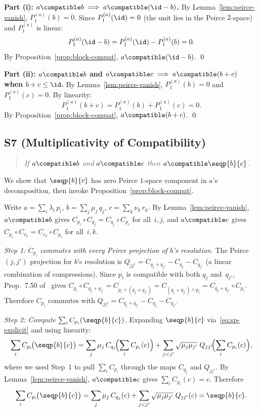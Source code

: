 \noindent\textbf{Part (i): $a \compatible b \implies a \compatible
(\id - b)$.}
By Lemma~\ref{lem:peirce-vanish}, $P_1^{(a)}(b) = 0$.  Since
$P_1^{(a)}(\id) = 0$ (the unit lies in the Peirce $2$-space) and
$P_1^{(a)}$ is linear:
\[
  P_1^{(a)}(\id - b) = P_1^{(a)}(\id) - P_1^{(a)}(b) = 0.
\]
By Proposition~\ref{prop:block-compat}, $a \compatible (\id - b)$.
\qed

\medskip
\noindent\textbf{Part (ii): $a \compatible b$ and $a \compatible c
\implies a \compatible (b+c)$ when $b + c \le \id$.}
By Lemma~\ref{lem:peirce-vanish}, $P_1^{(a)}(b) = 0$ and
$P_1^{(a)}(c) = 0$.  By linearity:
\[
  P_1^{(a)}(b + c) = P_1^{(a)}(b) + P_1^{(a)}(c) = 0.
\]
By Proposition~\ref{prop:block-compat}, $a \compatible (b+c)$. \qed

\subsection*{S7 (Multiplicativity of Compatibility)}

\begin{quote}
\emph{If $a \compatible b$ and $a \compatible c$ then
$a \compatible \seqp{b}{c}$.}
\end{quote}

We show that $\seqp{b}{c}$ has zero Peirce $1$-space component in $a$'s
decomposition, then invoke
Proposition~\ref{prop:block-compat}.

Write $a = \sum_i \lambda_i\, p_i$, $b = \sum_j \mu_j\, q_j$,
$c = \sum_k \nu_k\, r_k$.  By Lemma~\ref{lem:peirce-vanish},
$a \compatible b$ gives
$C_{p_i} \circ C_{q_j} = C_{q_j} \circ C_{p_i}$ for all~$i,j$,
and $a \compatible c$ gives
$C_{p_i} \circ C_{r_k} = C_{r_k} \circ C_{p_i}$ for all~$i,k$.

\emph{Step 1: $C_{p_i}$ commutes with every Peirce projection of $b$'s
resolution.}
The Peirce $(j,j')$ projection for $b$'s resolution is
$Q_{jj'} = C_{q_j + q_{j'}} - C_{q_j} - C_{q_{j'}}$
(a linear combination of compressions).
Since $p_i$ is compatible with both $q_j$ and~$q_{j'}$,
Prop.~7.50 of~\cite{AlfsenShultz2003} gives
$C_{p_i} \circ C_{q_j + q_{j'}} = C_{p_i \wedge (q_j + q_{j'})}
= C_{(q_j + q_{j'}) \wedge p_i} = C_{q_j + q_{j'}} \circ C_{p_i}$.
Therefore $C_{p_i}$ commutes with
$Q_{jj'} = C_{q_j + q_{j'}} - C_{q_j} - C_{q_{j'}}$.

\emph{Step 2: Compute $\sum_i C_{p_i}(\seqp{b}{c})$.}
Expanding $\seqp{b}{c}$ via~\eqref{eq:sp-explicit} and using linearity:
\[
  \sum_i C_{p_i}\!\bigl(\seqp{b}{c}\bigr)
  = \sum_j \mu_j\, C_{q_j}\!\Bigl(\sum_i C_{p_i}(c)\Bigr)
  + \sum_{j<j'} \sqrt{\mu_j\mu_{j'}}\; Q_{jj'}\!\Bigl(\sum_i C_{p_i}(c)\Bigr),
\]
where we used Step~1 to pull $\sum_i C_{p_i}$ through the maps $C_{q_j}$
and $Q_{jj'}$.  By Lemma~\ref{lem:peirce-vanish}, $a \compatible c$
gives $\sum_i C_{p_i}(c) = c$.  Therefore
\[
  \sum_i C_{p_i}\!\bigl(\seqp{b}{c}\bigr)
  = \sum_j \mu_j\, C_{q_j}(c) + \sum_{j<j'} \sqrt{\mu_j\mu_{j'}}\;
    Q_{jj'}(c)
  = \seqp{b}{c}.
\]

